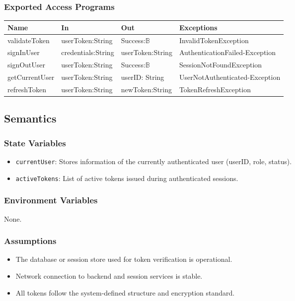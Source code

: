 \documentclass[12pt, titlepage]{article}
\newcommand{\Bool}{\ensuremath{\mathbb{B}}}
\begin{document}
\subsubsection{Exported Access Programs}

\begin{center}
  \begin{tabular}{p{3cm} p{4cm} p{3cm} p{4cm}}
    \hline
    \textbf{Name} & \textbf{In} & \textbf{Out} & \textbf{Exceptions} \\
    \hline
    validateToken & userToken:String & Success:\Bool & InvalidTokenException \\
    \hline
    signInUser & credentials:String  & userToken:String &
    AuthenticationFailed-Exception \\
    \hline
    signOutUser & userToken:String & Success:\Bool & SessionNotFoundException \\
    \hline
    getCurrentUser & userToken:String & userID: String &
    UserNotAuthenticated-Exception \\
    \hline
    refreshToken & userToken:String & newToken:String & TokenRefreshException \\
    \hline
  \end{tabular}
\end{center}
\subsection{Semantics}

\subsubsection{State Variables}
\begin{itemize}
  \item \texttt{currentUser}: Stores information of the currently
    authenticated user (userID, role, status).
  \item \texttt{activeTokens}: List of active tokens issued during
    authenticated sessions.
\end{itemize}

\subsubsection{Environment Variables}
None.

\subsubsection{Assumptions}
\begin{itemize}
  \item The database or session store used for token verification is
    operational.
  \item Network connection to backend and session services is stable.
  \item All tokens follow the system-defined structure and encryption standard.
\end{itemize}
\end{document}
